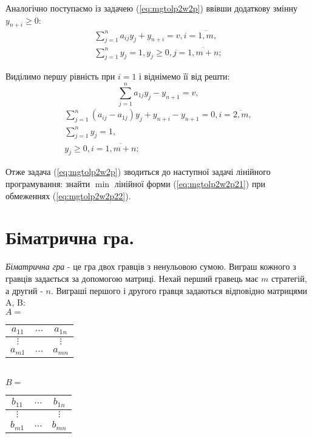 \documentclass[12pt,a4paper]{book}
\begin{document}
Аналогічно поступаємо із задачею (\ref{eq:mgtolp2w2p}) ввівши додаткову змінну $y_{n+i} \geq 0$:
\[ \begin{array}{l}
\displaystyle \sum_{j=1}^n a_{ij} y_j + y_{n+i} = v,  i=\overline{1,m},\\
\displaystyle \sum_{j=1}^n y_j = 1, y_j \geq 0, j=\overline{1,m+n};
\end{array} \]

Виділимо першу рівність при $i=1$ і віднімемо її від решти:
\begin{equation} \sum_{j=1}^n a_{1 j} y_j  - y_{n+1} = v, \label{eq:mgtolp2w2p21} \end{equation}
\begin{equation}
\begin{array}{l}
\displaystyle \sum_{j=1}^n (a_{ij} - a_{1 j}) y_j  + y_{n+i} - y_{n+1} = 0,  i=\overline{2,m},\\
\displaystyle \sum_{j=1}^n y_j = 1,\\
y_j \geq 0, i=\overline{1,m+n};
\end{array}
\label{eq:mgtolp2w2p22}
\end{equation}

Отже задача (\ref{eq:mgtolp2w2p}) зводиться до наступної задачі лінійного програмування: знайти $\min$ лінійної форми (\ref{eq:mgtolp2w2p21}) при обмеженнях (\ref{eq:mgtolp2w2p22}).

\section{Біматрична гра.}

\emph{Біматрична гра} - це гра двох гравців з ненульовою сумою. Виграш кожного з гравців задається за допомогою матриці. Нехай перший гравець має $m$ стратегій, а другий - $n$. Виграші першого і другого гравця задаються відповідно матрицями A, B:\\
$A =$
\begin{tabular}{|c|c|c|}
\hline
$a_{1 1}$&$\dots$&$a_{1 n}$\\
\hline
$\vdots$&&$\vdots$\\
\hline
$a_{m 1}$&$\dots$&$a_{m n}$\\
\hline
\end{tabular}\\
$B =$
\begin{tabular}{|c|c|c|}
\hline
$b_{1 1}$&$\dots$&$b_{1 n}$\\
\hline
$\vdots$&&$\vdots$\\
\hline
$b_{m 1}$&$\dots$&$b_{m n}$\\
\hline
\end{tabular}
\end{document}
